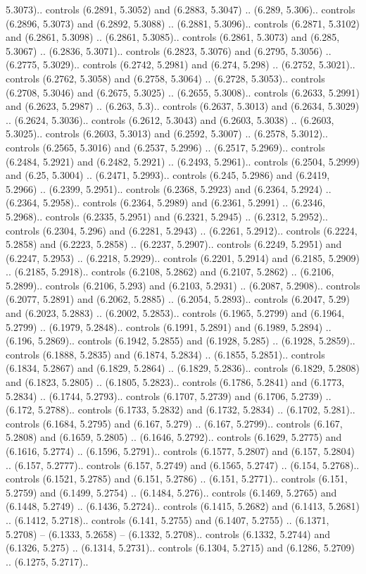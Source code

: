 5.3073).. controls (6.2891, 5.3052) and (6.2883, 5.3047) .. (6.289, 5.306).. controls (6.2896, 5.3073) and (6.2892, 5.3088) .. (6.2881, 5.3096).. controls (6.2871, 5.3102) and (6.2861, 5.3098) .. (6.2861, 5.3085).. controls (6.2861, 5.3073) and (6.285, 5.3067) .. (6.2836, 5.3071).. controls (6.2823, 5.3076) and (6.2795, 5.3056) .. (6.2775, 5.3029).. controls (6.2742, 5.2981) and (6.274, 5.298) .. (6.2752, 5.3021).. controls (6.2762, 5.3058) and (6.2758, 5.3064) .. (6.2728, 5.3053).. controls (6.2708, 5.3046) and (6.2675, 5.3025) .. (6.2655, 5.3008).. controls (6.2633, 5.2991) and (6.2623, 5.2987) .. (6.263, 5.3).. controls (6.2637, 5.3013) and (6.2634, 5.3029) .. (6.2624, 5.3036).. controls (6.2612, 5.3043) and (6.2603, 5.3038) .. (6.2603, 5.3025).. controls (6.2603, 5.3013) and (6.2592, 5.3007) .. (6.2578, 5.3012).. controls (6.2565, 5.3016) and (6.2537, 5.2996) .. (6.2517, 5.2969).. controls (6.2484, 5.2921) and (6.2482, 5.2921) .. (6.2493, 5.2961).. controls (6.2504, 5.2999) and (6.25, 5.3004) .. (6.2471, 5.2993).. controls (6.245, 5.2986) and (6.2419, 5.2966) .. (6.2399, 5.2951).. controls (6.2368, 5.2923) and (6.2364, 5.2924) .. (6.2364, 5.2958).. controls (6.2364, 5.2989) and (6.2361, 5.2991) .. (6.2346, 5.2968).. controls (6.2335, 5.2951) and (6.2321, 5.2945) .. (6.2312, 5.2952).. controls (6.2304, 5.296) and (6.2281, 5.2943) .. (6.2261, 5.2912).. controls (6.2224, 5.2858) and (6.2223, 5.2858) .. (6.2237, 5.2907).. controls (6.2249, 5.2951) and (6.2247, 5.2953) .. (6.2218, 5.2929).. controls (6.2201, 5.2914) and (6.2185, 5.2909) .. (6.2185, 5.2918).. controls (6.2108, 5.2862) and (6.2107, 5.2862) .. (6.2106, 5.2899).. controls (6.2106, 5.293) and (6.2103, 5.2931) .. (6.2087, 5.2908).. controls (6.2077, 5.2891) and (6.2062, 5.2885) .. (6.2054, 5.2893).. controls (6.2047, 5.29) and (6.2023, 5.2883) .. (6.2002, 5.2853).. controls (6.1965, 5.2799) and (6.1964, 5.2799) .. (6.1979, 5.2848).. controls (6.1991, 5.2891) and (6.1989, 5.2894) .. (6.196, 5.2869).. controls (6.1942, 5.2855) and (6.1928, 5.285) .. (6.1928, 5.2859).. controls (6.1888, 5.2835) and (6.1874, 5.2834) .. (6.1855, 5.2851).. controls (6.1834, 5.2867) and (6.1829, 5.2864) .. (6.1829, 5.2836).. controls (6.1829, 5.2808) and (6.1823, 5.2805) .. (6.1805, 5.2823).. controls (6.1786, 5.2841) and (6.1773, 5.2834) .. (6.1744, 5.2793).. controls (6.1707, 5.2739) and (6.1706, 5.2739) .. (6.172, 5.2788).. controls (6.1733, 5.2832) and (6.1732, 5.2834) .. (6.1702, 5.281).. controls (6.1684, 5.2795) and (6.167, 5.279) .. (6.167, 5.2799).. controls (6.167, 5.2808) and (6.1659, 5.2805) .. (6.1646, 5.2792).. controls (6.1629, 5.2775) and (6.1616, 5.2774) .. (6.1596, 5.2791).. controls (6.1577, 5.2807) and (6.157, 5.2804) .. (6.157, 5.2777).. controls (6.157, 5.2749) and (6.1565, 5.2747) .. (6.154, 5.2768).. controls (6.1521, 5.2785) and (6.151, 5.2786) .. (6.151, 5.2771).. controls (6.151, 5.2759) and (6.1499, 5.2754) .. (6.1484, 5.276).. controls (6.1469, 5.2765) and (6.1448, 5.2749) .. (6.1436, 5.2724).. controls (6.1415, 5.2682) and (6.1413, 5.2681) .. (6.1412, 5.2718).. controls (6.141, 5.2755) and (6.1407, 5.2755) .. (6.1371, 5.2708) -- (6.1333, 5.2658) -- (6.1332, 5.2708).. controls (6.1332, 5.2744) and (6.1326, 5.275) .. (6.1314, 5.2731).. controls (6.1304, 5.2715) and (6.1286, 5.2709) .. (6.1275, 5.2717).. 